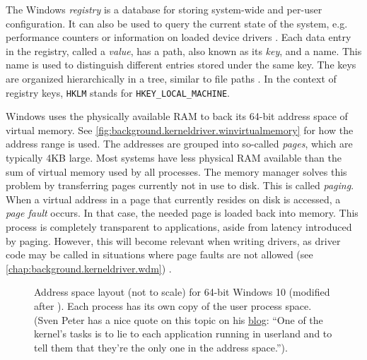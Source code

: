 The Windows \emph{registry} is a database for storing system-wide and per-user configuration. It can also be used to query the current state of the system, e.g. performance counters or information on loaded device drivers \cite{Yosifovich2017}. Each data entry in the registry, called a \emph{value}, has a path, also known as its \emph{key}, and a name. This name is used to distinguish different entries stored under the same key. The keys are organized hierarchically in a tree, similar to file paths \cite{Win32}. In the context of registry keys, \texttt{HKLM} stands for \texttt{HKEY\_LOCAL\_MACHINE}.

Windows uses the physically available RAM to back its 64-bit address space of virtual memory. See \autoref{fig:background.kerneldriver.winvirtualmemory} for how the address range is used. The addresses are grouped into so-called \emph{pages}, which are typically 4KB large. Most systems have less physical RAM available than the sum of virtual memory used by all processes. The memory manager solves this problem by transferring pages currently not in use to disk. This is called \emph{paging}. When a virtual address in a page that currently resides on disk is accessed, a \emph{page fault} occurs. In that case, the needed page is loaded back into memory. This process is completely transparent to applications, aside from latency introduced by paging. However, this will become relevant when writing drivers, as driver code may be called in situations where page faults are not allowed (see \autoref{chap:background.kerneldriver.wdm}) \cite{Yosifovich2017}.

\begin{figure}[htb!]
	\center
	\caption[
		Address space layout for 64-bit Windows 10.
	]{
		Address space layout (not to scale) for 64-bit Windows 10 (modified after \cite{Yosifovich2017}). %
		Each process has its own copy of the user process space.\\
		(Sven Peter has a nice quote on this topic on his \href{https://blog.svenpeter.dev/posts/m1_sprr_gxf/}{blog}: ``One of the kernel's tasks is to lie to each application running in userland and to tell them that they're the only one in the address space.'').
	}
	\label{fig:background.kerneldriver.winvirtualmemory}
\end{figure}

